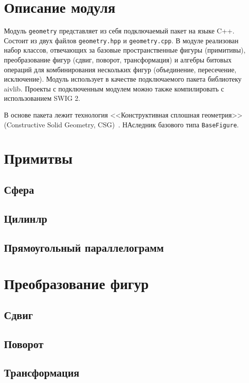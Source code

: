 \section{Описание модуля}
Модуль \verb"geometry" представляет из себя подключаемый пакет на языке {\sf C++}. Состоит из двух файлов \verb"geometry.hpp" и \verb"geometry.cpp". В модуле реализован набор классов, отвечающих за базовые пространственные фигуры (примитивы), преобразование фигур (сдвиг, поворот, трансформация) и алгебры битовых операций для комбинирования нескольких фигур (объединение, пересечение, исключение). Модуль использует в качестве подключаемого пакета библиотеку {\sf aivlib}. Проекты с подключенным модулем можно также компилировать с использованием {\sf SWIG 2}.

В основе пакета лежит технология <<Конструктивная сплошная геометрия>> (Constructive Solid Geometry, CSG)~\cite{csg}. 
НАследник базового типа \verb"BaseFigure".

\section{Примитвы}

\subsection{Сфера}
\subsection{Цилинлр}
\subsection{Прямоугольный параллелограмм}

\section{Преобразование фигур}

\subsection{Сдвиг}
\subsection{Поворот}
\subsection{Трансформация}

